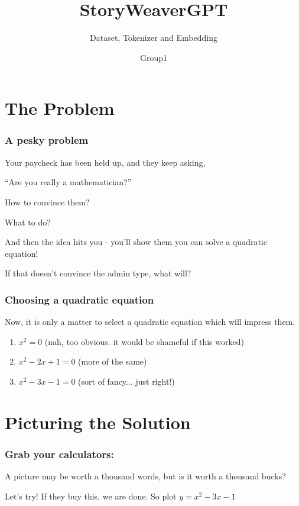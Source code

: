 \documentclass[
    10pt %
    16:9, %
]{beamer}
\title{StoryWeaverGPT}
\subtitle{Dataset, Tokenizer and Embedding}
\author{Group1}
\begin{document}
\frame{\titlepage} %
\section[Outline]{}
\frame{\tableofcontents}

\section{The Problem}
 
 
\frame %
{
  \frametitle{A pesky problem}
 
Your paycheck has been held up, and they keep asking,

\medskip

 ``Are you really a mathematician?''

\bigskip
\pause

How to convince them?

\medskip
\pause

What to do?

\medskip
\pause

And then the idea hits you - you'll show them you can solve a quadratic equation!

\medskip
\pause

If that doesn't convince the admin type, what will?

  
\vfill   
}
 
 \frame %
{
  \frametitle{Choosing a quadratic equation}

Now, it is only a matter to select a quadratic equation which will impress them.

\pause

\begin{enumerate}
\item $x^2  = 0$ \pause (nah, too obvious. it would be shameful if this worked)
\pause 
\item $x^2 -2x +1 = 0$ \pause (more of the same)
\pause
\item $x^2 -3x -1 = 0$ \pause (sort of fancy... just right!)
\end{enumerate}

}


\section{Picturing the Solution}
 
\frame %
{
  \frametitle{Grab your calculators:}
 
 A picture may be worth a thousand words, but is it worth   a thousand bucks?
 
 \medskip
 \pause
 
 Let's try! If they buy this, we are done. So plot $y = x^2 -3x -1$
 
 \pause
 

 
 \vfill   

}
\end{document}
